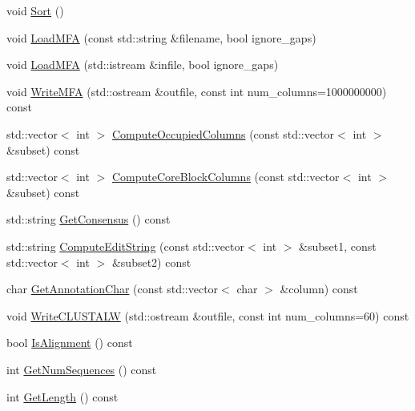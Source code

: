 \begin{DoxyCompactItemize}
\item 
void \hyperlink{class_c_o_n_t_r_a_l_i_g_n_1_1_multi_sequence_ab61280b0de5269dd4516951b10919deb}{Sort} ()
\item 
void \hyperlink{class_c_o_n_t_r_a_l_i_g_n_1_1_multi_sequence_ae146b1733c2a83f00af69bdbbc241ab1}{Load\+M\+F\+A} (const std\+::string \&filename, bool ignore\+\_\+gaps)
\item 
void \hyperlink{class_c_o_n_t_r_a_l_i_g_n_1_1_multi_sequence_a71e2977045e4e2f62fc33890b5f31835}{Load\+M\+F\+A} (std\+::istream \&infile, bool ignore\+\_\+gaps)
\item 
void \hyperlink{class_c_o_n_t_r_a_l_i_g_n_1_1_multi_sequence_a9153b19620cf8e9446b02c6417f04e9a}{Write\+M\+F\+A} (std\+::ostream \&outfile, const int num\+\_\+columns=1000000000) const 
\item 
std\+::vector$<$ int $>$ \hyperlink{class_c_o_n_t_r_a_l_i_g_n_1_1_multi_sequence_a0a7fe6ed9037c94191b82795a246a203}{Compute\+Occupied\+Columns} (const std\+::vector$<$ int $>$ \&subset) const 
\item 
std\+::vector$<$ int $>$ \hyperlink{class_c_o_n_t_r_a_l_i_g_n_1_1_multi_sequence_ae0c12ddf72523780198d657f7852d6de}{Compute\+Core\+Block\+Columns} (const std\+::vector$<$ int $>$ \&subset) const 
\item 
std\+::string \hyperlink{class_c_o_n_t_r_a_l_i_g_n_1_1_multi_sequence_a9e9e6c805eae30fa551d6d341c200ed7}{Get\+Consensus} () const 
\item 
std\+::string \hyperlink{class_c_o_n_t_r_a_l_i_g_n_1_1_multi_sequence_a2c4b0d29f1c7679a5792819878dc5ef1}{Compute\+Edit\+String} (const std\+::vector$<$ int $>$ \&subset1, const std\+::vector$<$ int $>$ \&subset2) const 
\item 
char \hyperlink{class_c_o_n_t_r_a_l_i_g_n_1_1_multi_sequence_aa7228ed5e1a18a617184dfb4d76a4b76}{Get\+Annotation\+Char} (const std\+::vector$<$ char $>$ \&column) const 
\item 
void \hyperlink{class_c_o_n_t_r_a_l_i_g_n_1_1_multi_sequence_a560348bac0478c3fe65728088c3a88ef}{Write\+C\+L\+U\+S\+T\+A\+L\+W} (std\+::ostream \&outfile, const int num\+\_\+columns=60) const 
\item 
bool \hyperlink{class_c_o_n_t_r_a_l_i_g_n_1_1_multi_sequence_a9d7fec20b636d56e575a30393ff2c1c3}{Is\+Alignment} () const 
\item 
int \hyperlink{class_c_o_n_t_r_a_l_i_g_n_1_1_multi_sequence_ac02a6ce3398828a4895156affdb0bbed}{Get\+Num\+Sequences} () const 
\item 
int \hyperlink{class_c_o_n_t_r_a_l_i_g_n_1_1_multi_sequence_acc8a3efcaae6a0a8f0994527a9632714}{Get\+Length} () const 

\end{DoxyCompactItemize}
